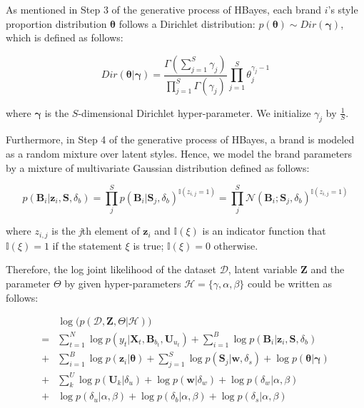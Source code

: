 As mentioned in Step 3 of the generative process of HBayes, each brand $i$'s style proportion distribution $\boldsymbol{\theta}$ follows a Dirichlet distribution: $p(\boldsymbol{\theta}) \sim Dir(\boldsymbol{\gamma})$, which is defined as follows: 

\begin{equation*}
Dir(\bm{\theta}|\bm{\gamma})=\frac{\Gamma(\sum_{j=1}^{S}\gamma_j)}{\prod_{j=1}^{S}\Gamma(\gamma_j)}\prod_{j=1}^S \theta_j^{\gamma_j-1}
\end{equation*}

\noindent where $\bm{\gamma}$ is the $S$-dimensional Dirichlet hyper-parameter. We initialize $\gamma_j$ by $\frac{1}{S}$. 

Furthermore, in Step 4 of the generative process of HBayes, a brand is modeled as a random mixture over latent styles. Hence, we model the brand parameters by a mixture of multivariate Gaussian distribution defined as follows:

\begin{equation*}
p(\bm{B}_i|\bm{z}_i,\bm{S},\delta_b) = \prod_{j}^S p(\bm{B}_i|\bm{S}_j,\delta_b)^{\mathbb{I}(z_{i,j}=1)} = \prod_{j}^S \mathcal{N}(\bm{B}_i; \bm{S}_j,\delta_b) ^{\mathbb{I}(z_{i,j}=1)}
\end{equation*}

\noindent where $z_{i,j}$ is the \emph{j}th element of $\mathbf{z}_i$ and $\mathbb{I}(\xi)$ is an indicator function that $\mathbb{I}(\xi)=1$ if the statement $\xi$ is true; $\mathbb{I}(\xi)=0$ otherwise.

Therefore, the log joint likelihood of the dataset $\mathcal{D}$, latent variable $\bm{Z}$ and the parameter $\Theta$ by given hyper-parameters $\mathcal{H} = \{\gamma, \alpha,\beta\}$ could be written as follows:

\begin{align}
 & \log \big( p(\mathcal{D},\bm{Z},\Theta|\mathcal{H}) \big) \nonumber \\
= & \sum_{t=1}^N \log p(y_t|\bm{X}_t,\bm{B}_{b_t},\bm{U}_{u_t}) + \sum_{i=1}^B \log p(\bm{B}_i|\bm{z}_i,\bm{S},\delta_b)  \nonumber \\
+ & \sum_{i=1}^B \log p(\bm{z}_{i}|\bm{\theta}) + \sum_{j=1}^S \log p(\bm{S}_j|\bm{w},\delta_s) + \log p(\bm{\theta}|\bm{\gamma})   \nonumber \\
+ & \sum_{k}^U \log p(\bm{U}_k|\delta_u) + \log p(\bm{w}|\delta_w) +  \log p(\delta_w|\alpha,\beta) \nonumber  \\
+ & \log p(\delta_u|\alpha,\beta) + \log p(\delta_b|\alpha,\beta) + \log p(\delta_s|\alpha,\beta)
\label{eq:log_likelihood}
\end{align}

